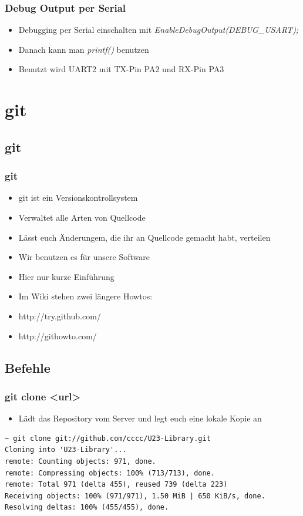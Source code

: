 \documentclass[ngerman,compress]{beamer}
\begin{document}
\begin{frame}
	\frametitle{Debug Output per Serial}
	\begin{itemize}
		\item Debugging per Serial einschalten mit \emph{EnableDebugOutput(DEBUG\_USART);}
		\item Danach kann man \emph{printf()} benutzen
		\item Benutzt wird UART2 mit TX-Pin PA2 und RX-Pin PA3
	\end{itemize}
\end{frame}


\section{git}

\subsection{git}

\begin{frame}
	\frametitle{git}
	\begin{itemize}
		\item git ist ein Versionskontrollsystem
		\item Verwaltet alle Arten von Quellcode
		\item Lässt euch Änderungem, die ihr an Quellcode gemacht habt, verteilen
		\item Wir benutzen es für unsere Software
		\item Hier nur kurze Einführung
		\item Im Wiki stehen zwei längere Howtos:
		\item http://try.github.com/
		\item http://githowto.com/
	\end{itemize}
\end{frame}

\subsection{Befehle}

\begin{frame} [fragile]
	\frametitle{git clone <url>}
	\begin{itemize}
		\item Lädt das Repository vom Server und legt euch eine lokale Kopie an
	\end{itemize}

	\begin{lstlisting}
~ git clone git://github.com/cccc/U23-Library.git
Cloning into 'U23-Library'...
remote: Counting objects: 971, done.
remote: Compressing objects: 100% (713/713), done.
remote: Total 971 (delta 455), reused 739 (delta 223)
Receiving objects: 100% (971/971), 1.50 MiB | 650 KiB/s, done.
Resolving deltas: 100% (455/455), done.
	\end{lstlisting}
\end{frame}
\end{document}
